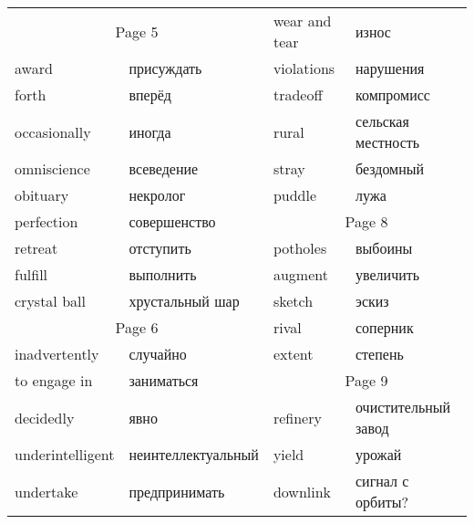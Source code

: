 \documentclass[12pt]{article}
\begin{document}
\begin{tabular}{| l l | l l | }
  \cline{1-2}\multicolumn{2}{|c|}{Page 5} & wear and tear & износ \\
  award & присуждать & violations  & нарушения \\
  forth & вперёд & tradeoff & компромисс \\
  occasionally & иногда & rural & сельская местность \\
  omniscience & всеведение & stray & бездомный \\
  obituary  & некролог & puddle & лужа \\ \cline{3-4}
  perfection  & совершенство & \multicolumn{2}{c|}{Page 8} \\
  retreat & отступить & potholes & выбоины \\
  fulfill & выполнить & augment & увеличить \\
  crystal ball & хрустальный шар & sketch & эскиз \\

  \cline{1-2}\multicolumn{2}{|c|}{Page 6} & rival & соперник \\
  inadvertently & случайно & extent & степень \\ \cline{3-4}
  to engage in & заниматься & \multicolumn{2}{c|}{Page 9} \\
  decidedly & явно & refinery & очистительный завод \\
  underintelligent & неинтеллектуальный & yield & урожай \\
  undertake & предпринимать & downlink & сигнал с орбиты?\\
  \hline

\end{tabular}
\end{document}
